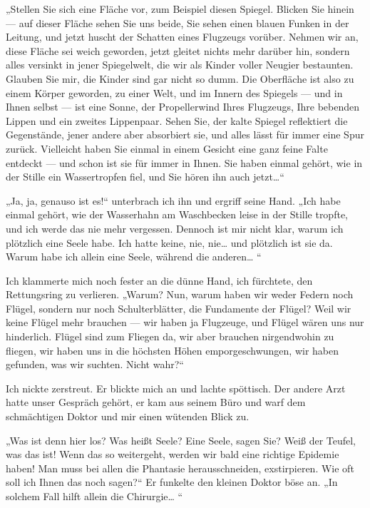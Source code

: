 „Stellen Sie sich eine Fläche vor, zum Beispiel diesen Spiegel.
Blicken Sie hinein — auf dieser Fläche sehen Sie uns beide, Sie
sehen einen blauen Funken in der Leitung, und jetzt huscht der
Schatten eines Flugzeugs vorüber. Nehmen wir an, diese Fläche sei
weich geworden, jetzt gleitet nichts mehr darüber hin, sondern
alles versinkt in jener Spiegelwelt, die wir als Kinder voller
Neugier bestaunten. Glauben Sie mir, die Kinder sind gar nicht so
dumm. Die Oberfläche ist also zu einem Körper geworden, zu einer
Welt, und im Innern des Spiegels — und in Ihnen selbst — ist eine
Sonne, der Propellerwind Ihres Flugzeugs, Ihre bebenden Lippen und
ein zweites Lippenpaar. Sehen Sie, der kalte Spiegel reflektiert
die Gegenstände, jener andere aber absorbiert sie, und alles lässt
für immer eine Spur zurück. Vielleicht haben Sie einmal in einem
Gesicht eine ganz feine Falte entdeckt — und schon ist sie für
immer in Ihnen. Sie haben einmal gehört, wie in der Stille ein
Wassertropfen fiel, und Sie hören ihn auch jetzt\ldots{}“

„Ja, ja, genauso ist es!“ unterbrach ich ihn und ergriff seine
Hand. „Ich habe einmal gehört, wie der Wasserhahn am Waschbecken
leise in der Stille tropfte, und ich werde das nie mehr vergessen.
Dennoch ist mir nicht klar, warum ich plötzlich eine Seele habe.
Ich hatte keine, nie, nie\ldots{} und plötzlich ist sie da. Warum habe
ich allein eine Seele, während die anderen\ldots{} “

Ich klammerte mich noch fester an die dünne Hand, ich fürchtete,
den Rettungsring zu verlieren. „Warum? Nun, warum haben wir weder
Federn noch Flügel, sondern nur noch Schulterblätter, die
Fundamente
der Flügel? Weil wir keine Flügel mehr brauchen — wir haben ja
Flugzeuge, und Flügel wären uns nur hinderlich. Flügel sind zum
Fliegen da, wir aber brauchen nirgendwohin zu fliegen, wir haben
uns in die höchsten Höhen emporgeschwungen, wir haben gefunden, was
wir suchten. Nicht wahr?“

Ich nickte zerstreut. Er blickte mich an und lachte spöttisch. Der
andere Arzt hatte unser Gespräch gehört, er kam aus seinem Büro und
warf dem schmächtigen Doktor und mir einen wütenden Blick zu.

„Was ist denn hier los? Was heißt Seele? Eine Seele, sagen Sie?
Weiß der Teufel, was das ist! Wenn das so weitergeht, werden wir
bald eine richtige Epidemie haben! Man muss bei allen die Phantasie
herausschneiden, exstirpieren. Wie oft soll ich Ihnen das noch
sagen?“ Er funkelte den kleinen Doktor böse an. „In solchem Fall
hilft allein die Chirurgie\ldots{} “

